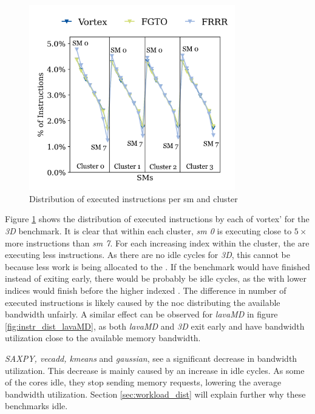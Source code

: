\begin{figure}
    \centering
    \includegraphics[width=0.8\textwidth]{figures/instruction_distribution/hotspot3D_unsorted_numbered.png}
    \caption{Distribution of executed instructions per \acrshort{sm} and cluster}
    \label{fig:instruction_distribution_unsorted_3D}
\end{figure}

Figure \ref{fig:instruction_distribution_unsorted_3D} shows the distribution of executed instructions by each of \Gls{vortex}'  for the \textit{3D} benchmark. It is clear that within each cluster, \textit{\acrshort{sm} 0} is executing close to $5\times$ more instructions than \textit{\acrshort{sm} 7}. For each increasing index within the cluster, the  are executing less instructions. As there are no idle cycles for \textit{3D}, this cannot be because less work is being allocated to the . If the benchmark would have finished instead of exiting early, there would be probably be idle cycles, as the  with lower indices would finish before the higher indexed . The difference in number of executed instructions is likely caused by the \acrshort{noc} distributing the available bandwidth unfairly. A similar effect can be observed for \textit{lavaMD} in figure \ref{fig:instr_dist_lavaMD}, as both \textit{lavaMD} and \textit{3D} exit early and have bandwidth utilization close to the available memory bandwidth.

\textit{SAXPY, vecadd, kmeans} and \textit{gaussian}, see a significant decrease in bandwidth utilization. This decrease is mainly caused by an increase in idle cycles. As some of the cores idle, they stop sending memory requests, lowering the average bandwidth utilization. Section \ref{sec:workload_dist} will explain further why these benchmarks idle.

